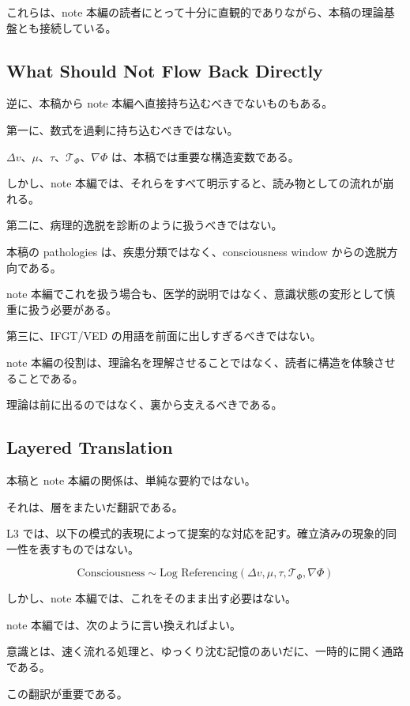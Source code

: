 これらは、note 本編の読者にとって十分に直観的でありながら、本稿の理論基盤とも接続している。

\subsection{What Should Not Flow Back Directly}

逆に、本稿から note 本編へ直接持ち込むべきでないものもある。

第一に、数式を過剰に持ち込むべきではない。

$\Delta v$、$\mu$、$\tau$、$\mathcal{T}_{\Phi}$、$\nabla \Phi$ は、本稿では重要な構造変数である。

しかし、note 本編では、それらをすべて明示すると、読み物としての流れが崩れる。

第二に、病理的逸脱を診断のように扱うべきではない。

本稿の pathologies は、疾患分類ではなく、consciousness window からの逸脱方向である。

note 本編でこれを扱う場合も、医学的説明ではなく、意識状態の変形として慎重に扱う必要がある。

第三に、IFGT/VED の用語を前面に出しすぎるべきではない。

note 本編の役割は、理論名を理解させることではなく、読者に構造を体験させることである。

理論は前に出るのではなく、裏から支えるべきである。

\subsection{Layered Translation}

本稿と note 本編の関係は、単純な要約ではない。

それは、層をまたいだ翻訳である。

L3 では、以下の模式的表現によって提案的な対応を記す。確立済みの現象的同一性を表すものではない。

\begin{equation}
\text{Consciousness}
\sim
\text{Log Referencing}
\left(
\Delta v,
\mu,
\tau,
\mathcal{T}_{\Phi},
\nabla \Phi
\right)
\end{equation}

しかし、note 本編では、これをそのまま出す必要はない。

note 本編では、次のように言い換えればよい。

意識とは、速く流れる処理と、ゆっくり沈む記憶のあいだに、一時的に開く通路である。

この翻訳が重要である。

